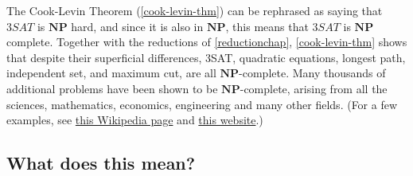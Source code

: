 \hypertarget{NPC-def}{}

The Cook-Levin Theorem (\cref{cook-levin-thm}) can be rephrased as
saying that \(3\ensuremath{\mathit{SAT}}\) is \(\mathbf{NP}\) hard, and
since it is also in \(\mathbf{NP}\), this means that
\(3\ensuremath{\mathit{SAT}}\) is \(\mathbf{NP}\) complete. Together
with the reductions of \cref{reductionchap}, \cref{cook-levin-thm} shows
that despite their superficial differences, 3SAT, quadratic equations,
longest path, independent set, and maximum cut, are all
\(\mathbf{NP}\)-complete. Many thousands of additional problems have
been shown to be \(\mathbf{NP}\)-complete, arising from all the
sciences, mathematics, economics, engineering and many other fields.
(For a few examples, see \href{https://goo.gl/NomnoU}{this Wikipedia
page} and \href{https://goo.gl/nfJHWv}{this website}.)

\hypertarget{npcomplete}{}

\subsection{What does this mean?}\label{What-does-this-mean}

